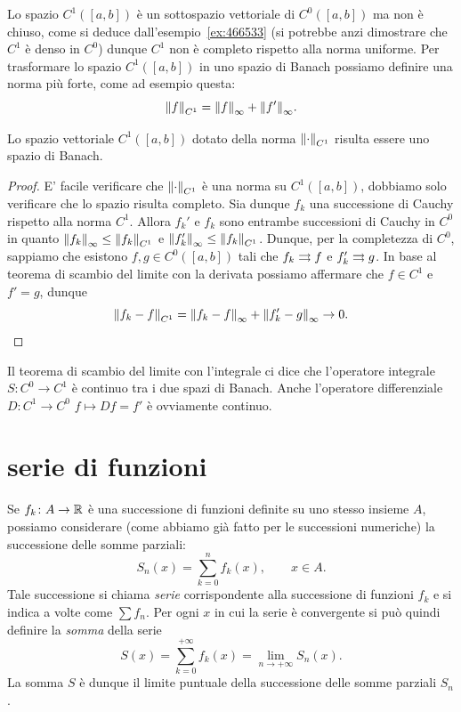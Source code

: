 Lo spazio $C^1([a,b])$ è un sottospazio vettoriale di $C^0([a,b])$ ma non è chiuso, come si deduce dall'esempio~\ref{ex:466533} (si potrebbe anzi dimostrare che $C^1$ è denso in $C^0$) dunque $C^1$ non è completo rispetto alla norma uniforme.
Per trasformare lo spazio $C^1([a,b])$ in uno spazio di Banach
possiamo definire una norma più forte, come ad esempio
questa:
\[
  {\left\Vert f\right\Vert}_{C^1} = {\left\Vert f\right\Vert}_\infty + {\left\Vert f'\right\Vert}_\infty.
\]
\begin{theorem}
\mymark{*}
Lo spazio vettoriale $C^1([a,b])$ dotato della norma ${\left\Vert \cdot\right\Vert}_{C^1}$ risulta essere uno spazio di Banach.
\end{theorem}
%
\begin{proof}
E' facile verificare che ${\left\Vert \cdot\right\Vert}_{C^1}$ è una norma su $C^1([a,b])$, dobbiamo solo verificare che lo spazio risulta completo. Sia dunque $f_k$ una successione di Cauchy rispetto alla norma $C^1$. Allora $f_k'$ e $f_k$ sono entrambe successioni di Cauchy in $C^0$ in quanto ${\left\Vert f_k\right\Vert}_\infty \le {\left\Vert f_k\right\Vert}_{C^1}$ e ${\left\Vert f_k'\right\Vert}_\infty \le {\left\Vert f_k\right\Vert}_{C^1}$.
Dunque, per la completezza di $C^0$, sappiamo che esistono $f,g\in C^0([a,b])$ tali che $f_k\rightrightarrows f$ e $f_k'\rightrightarrows g$.
In base al teorema di scambio del limite con la derivata possiamo affermare che $f\in C^1$ e $f'=g$, dunque
\[
  {\left\Vert f_k-f\right\Vert}_{C^1} = {\left\Vert f_k-f\right\Vert}_\infty + {\left\Vert f_k'-g\right\Vert}_\infty \to 0.
\]
\end{proof}

Il teorema di scambio del limite con l'integrale ci dice che
l'operatore integrale $S\colon C^0 \to C^1$ è continuo tra i due spazi di Banach. Anche l'operatore differenziale $D\colon C^1 \to C^0$ $f\mapsto Df = f'$ è ovviamente continuo.

\section{serie di funzioni}

Se $f_k\colon A \to {\mathbb R}$ è una successione di funzioni
definite su uno stesso insieme $A$, possiamo considerare (come abbiamo già fatto per le successioni numeriche) la successione delle somme parziali:
\[
  S_n(x) = \sum_{k=0}^n f_k(x), \qquad x\in A.
\]
Tale successione si chiama \emph{serie} corrispondente alla successione di funzioni $f_k$
e si indica a volte come $\sum f_n$. Per ogni $x$ in cui la serie è convergente si può quindi definire la
\emph{somma}%
 della serie
\[
  S(x) = \sum_{k=0}^{+\infty} f_k(x) = \lim_{n\to +\infty} S_n(x).
\]
La somma $S$ è dunque il limite puntuale della successione delle somme parziali $S_n$.

